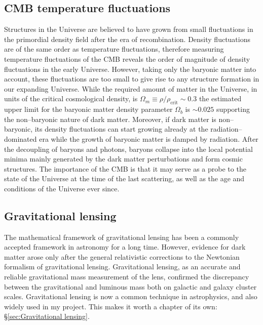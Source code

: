 \documentclass[a4wide,12pt]{book}
\begin{document}
{\subsection{CMB temperature fluctuations}
\label{subsec:CMB}
Structures in the Universe are believed to have grown from small fluctuations in the primordial density field after the era of recombination. Density fluctuations are of the same order as temperature fluctuations, therefore measuring temperature fluctuations of the CMB reveals the order of magnitude of density fluctuations in the early Universe. However, taking only the baryonic matter into account, these fluctuations are too small to give rise to any structure formation in our expanding Universe. While the required amount of matter in the Universe, in units of the critical cosmological density, is $\Omega_m \equiv \rho/\rho_\mathrm{crit}\sim 0.3$ the estimated upper limit for the baryonic matter density parameter $\Omega_b$ is $ \sim 0.025$ \citep[][]{Planck2015} supporting the non--baryonic nature of dark matter. Moreover, if dark matter is non--baryonic, its density fluctuations can start growing already at the radiation--dominated era while the growth of baryonic matter is damped by radiation. After the decoupling of baryons and photons, baryons collapse into the local potential minima mainly generated by the dark matter perturbations and form cosmic structures. The importance of the CMB is that it may serve as a probe to the state of the Universe at the time of the last scattering, as well as the age and conditions of the Universe ever since.

\subsection{Gravitational lensing}
The mathematical framework of gravitational lensing has been a commonly accepted framework in astronomy for a long time. However, evidence for dark matter arose only after the general relativistic corrections to the Newtonian formalism of gravitational lensing. Gravitational lensing, as an accurate and reliable gravitational mass measurement of the lens, confirmed the discrepancy between the gravitational and luminous mass both on galactic and galaxy cluster scales. Gravitational lensing is now a common technique in astrophysics, and also widely used in my project. This makes it worth a chapter of its own: \S \ref{sec:Gravitational lensing}.

}
\end{document}
